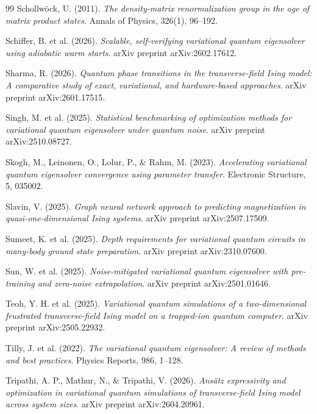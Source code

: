 \documentclass[11pt,a4paper,spanish]{book}
\begin{document}
\begin{thebibliography}{99}
 Schollw\"ock, U. (2011). \emph{The density-matrix renormalization group in the age of matrix product states}. Annals of Physics, 326(1), 96--192.

 Schiffer, B. et al. (2026). \emph{Scalable, self-verifying variational quantum eigensolver using adiabatic warm starts}. arXiv preprint arXiv:2602.17612.

 Sharma, R. (2026). \emph{Quantum phase transitions in the transverse-field Ising model: A comparative study of exact, variational, and hardware-based approaches}. arXiv preprint arXiv:2601.17515.

 Singh, M. et al. (2025). \emph{Statistical benchmarking of optimization methods for variational quantum eigensolver under quantum noise}. arXiv preprint arXiv:2510.08727.

 Skogh, M., Leinonen, O., Lolur, P., \& Rahm, M. (2023). \emph{Accelerating variational quantum eigensolver convergence using parameter transfer}. Electronic Structure, 5, 035002.

 Slavin, V. (2025). \emph{Graph neural network approach to predicting magnetization in quasi-one-dimensional Ising systems}. arXiv preprint arXiv:2507.17509.

 Sumeet, K. et al. (2025). \emph{Depth requirements for variational quantum circuits in many-body ground state preparation}. arXiv preprint arXiv:2310.07600.

 Sun, W. et al. (2025). \emph{Noise-mitigated variational quantum eigensolver with pre-training and zero-noise extrapolation}. arXiv preprint arXiv:2501.01646.

 Teoh, Y. H. et al. (2025). \emph{Variational quantum simulations of a two-dimensional frustrated transverse-field Ising model on a trapped-ion quantum computer}. arXiv preprint arXiv:2505.22932.

 Tilly, J. et al. (2022). \emph{The variational quantum eigensolver: A review of methods and best practices}. Physics Reports, 986, 1--128.

 Tripathi, A. P., Mathur, N., \& Tripathi, V. (2026). \emph{Ans\"atz expressivity and optimization in variational quantum simulations of transverse-field Ising model across system sizes}. arXiv preprint arXiv:2604.20961.


\end{thebibliography}
\end{document}
